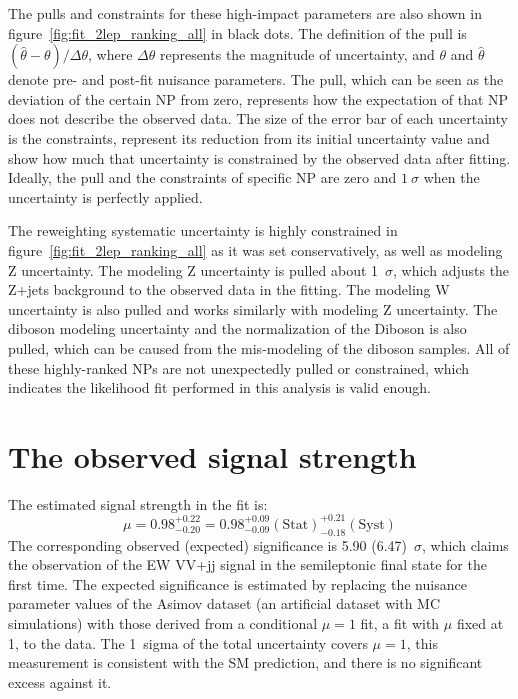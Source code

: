 The pulls and constraints for these high-impact parameters are also shown in figure~\ref{fig:fit_2lep_ranking_all} in black dots.
The definition of the pull is $(\hat{\theta}-\theta) / \Delta \theta$, where $\Delta \theta$ represents the magnitude of uncertainty, and $\theta$ and $\hat{\theta}$ denote pre- and post-fit nuisance parameters.
The pull, which can be seen as the deviation of the certain NP from zero, represents how the expectation of that NP does not describe the observed data.
The size of the error bar of each uncertainty is the constraints, represent its reduction from its initial uncertainty value and show how much that uncertainty is constrained by the observed data after fitting.
Ideally, the pull and the constraints of specific NP are zero and $1~\sigma$ when the uncertainty is perfectly applied.

The reweighting systematic uncertainty is highly constrained in figure~\ref{fig:fit_2lep_ranking_all} as it was set conservatively, as well as modeling Z uncertainty. 
The modeling Z uncertainty is pulled about 1~$\sigma$, which adjusts the Z+jets background to the observed data in the fitting. The modeling W uncertainty is also pulled and works similarly with modeling Z uncertainty. The diboson modeling uncertainty and the normalization of the Diboson is also pulled, which can be caused from the mis-modeling of the diboson samples.
All of these highly-ranked NPs are not unexpectedly pulled or constrained, which indicates the likelihood fit performed in this analysis is valid enough.

\section{The observed signal strength}
\label{sec:mu}
The estimated signal strength in the fit is:
\begin{equation}
    \mu = 0.98^{+ 0.22}_{- 0.20} = 0.98^{+ 0.09}_{- 0.09}(\mathrm{Stat})^{+ 0.21}_{- 0.18}(\mathrm{Syst}) 
\end{equation}
The corresponding observed (expected) significance is 5.90 (6.47)~$\sigma$, which claims the observation of the EW VV+jj signal in the semileptonic final state for the first time. 
The expected significance is estimated by replacing the nuisance parameter values of the Asimov dataset (an artificial dataset with MC simulations) with those derived from a conditional $\mu = 1$ fit, a fit with $\mu$ fixed at 1, to the data. 
The 1~sigma of the total uncertainty covers $\mu = 1$, this measurement is consistent with the SM prediction, and there is no significant excess against it.

